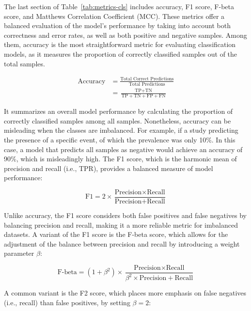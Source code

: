 The last section of Table~\ref{tab:metrics-cls} includes accuracy, F1 score, F-beta score, and Matthews Correlation Coefficient (MCC). These metrics offer a balanced evaluation of the model’s performance by taking into account both correctness and error rates, as well as both positive and negative samples. Among them, accuracy is the most straightforward metric for evaluating classification models, as it measures the proportion of correctly classified samples out of the total samples.

\begin{equation} \label{eq_accuracy}
    \begin{split}
\text{Accuracy} &= \frac{\text{Total Correct Predictions}}{\text{Total Predictions}} \\
        &= \frac{\text{TP} + \text{TN}}{\text{TP} + \text{TN} + \text{FP} + \text{FN}}
    \end{split}
\end{equation}

It summarizes an overall model performance by calculating the proportion of correctly classified samples among all samples. Nonetheless, accuracy can be misleading when the classes are imbalanced. For example, if a study predicting the presence of a specific event, of which the prevalence was only 10\%. In this case, a model that predicts all samples as negative would achieve an accuracy of 90\%, which is misleadingly high. 
The F1 score, which is the harmonic mean of precision and recall (i.e., TPR), provides a balanced measure of model performance:

\begin{equation} \label{eq_f1}
    \text{F1} = 2 \times \frac{\text{Precision} \times \text{Recall}}{\text{Precision} + \text{Recall}}
\end{equation}

Unlike accuracy, the F1 score considers both false positives and false negatives by balancing precision and recall, making it a more reliable metric for imbalanced datasets. A variant of the F1 score is the F-beta score, which allows for the adjustment of the balance between precision and recall by introducing a weight parameter $\beta$:

\begin{equation} \label{eq_fbeta}
    \text{F-beta} = (1 + \beta^2) \times \frac{\text{Precision} \times \text{Recall}}{\beta^2 \times \text{Precision} + \text{Recall}}
\end{equation}

A common variant is the F2 score, which places more emphasis on false negatives (i.e., recall) than false positives, by setting $\beta = 2$:

